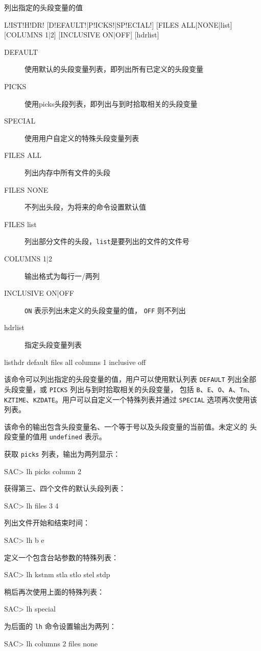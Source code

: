 \label{cmd:listhdr}

列出指定的头段变量的值

\begin{SACSTX}
L!IST!H!DR! [D!EFAULT!|P!ICKS!|SP!ECIAL!] [FILES ALL|NONE|list]
    [COLUMNS 1|2] [INCLUSIVE ON|OFF] [hdrlist]
\end{SACSTX}

\begin{description}
\item [DEFAULT] 使用默认的头段变量列表，即列出所有已定义的头段变量
\item [PICKS] 使用picks头段列表，即列出与到时拾取相关的头段变量
\item [SPECIAL] 使用用户自定义的特殊头段变量列表
\item [FILES ALL] 列出内存中所有文件的头段
\item [FILES NONE] 不列出头段，为将来的命令设置默认值
\item [FILES list] 列出部分文件的头段，\texttt{list}是要列出的文件的文件号
\item [COLUMNS 1|2] 输出格式为每行一/两列
\item [INCLUSIVE ON|OFF] \texttt{ON} 表示列出未定义的头段变量的值，
    \texttt{OFF} 则不列出
\item [hdrlist] 指定头段变量列表
\end{description}

\begin{SACDFT}
listhdr default files all columns 1 inclusive off
\end{SACDFT}

该命令可以列出指定的头段变量的值，用户可以使用默认列表 \texttt{DEFAULT}
列出全部头段变量，或 \texttt{PICKS} 列出与到时拾取相关的头段变量，
包括 \texttt{B}、\texttt{E}、\texttt{O}、\texttt{A}、\texttt{Tn}、
\texttt{KZTIME}、\texttt{KZDATE}。用户可以自定义一个特殊列表并通过
\texttt{SPECIAL} 选项再次使用该列表。

该命令的输出包含头段变量名、一个等于号以及头段变量的当前值。未定义的
头段变量的值用 \texttt{undefined} 表示。

获取 \texttt{picks} 列表，输出为两列显示：
\begin{SACCode}
SAC> lh picks column 2
\end{SACCode}

获得第三、四个文件的默认头段列表：
\begin{SACCode}
SAC> lh files 3 4
\end{SACCode}

列出文件开始和结束时间：
\begin{SACCode}
SAC> lh b e
\end{SACCode}

定义一个包含台站参数的特殊列表：
\begin{SACCode}
SAC> lh kstnm stla stlo stel stdp
\end{SACCode}

稍后再次使用上面的特殊列表：
\begin{SACCode}
SAC> lh special
\end{SACCode}

为后面的 \texttt{lh} 命令设置输出为两列：
\begin{SACCode}
SAC> lh columns 2 files none
\end{SACCode}
